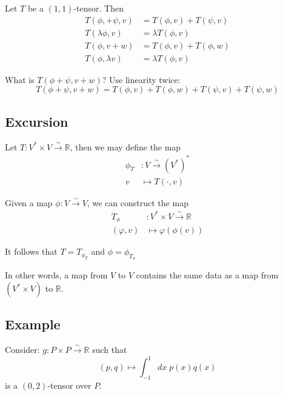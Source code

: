 \documentclass[
  letterpaper,
  DIV=11,
  numbers=noendperiod,
  oneside]{scrreprt}
\begin{document}
Let \(T\) be a \((1,1)\)-tensor. Then \begin{align}
    T(\phi, + \psi, v) &= T(\phi, v) + T(\psi, v) \\ 
    T(\lambda\phi, v) &= \lambda T(\phi, v) \\ 
    T(\phi, v+w) &= T(\phi, v) + T(\phi, w) \\ 
    T(\phi, \lambda v) &= \lambda T(\phi, v)
\end{align}

What is \(T(\phi + \psi, v + w)\)? Use linearity twice: \begin{equation}
    T(\phi + \psi, v + w) = T(\phi, v) + T(\phi, w) + T(\psi, v) + T(\psi, w)
\end{equation}

\hypertarget{excursion}{%
\subsection{Excursion}\label{excursion}}

Let \(T: V^* \times V \xrightarrow{\sim} \mathbb{R}\), then we may
define the map  \begin{align}
    \phi_T&: V \xrightarrow{\sim} (V^*)^*\\
    v&\mapsto T(\cdot, v)
\end{align}

Given a map \(\phi: V\xrightarrow{\sim} V\), we can construct the map
\begin{align}
    T_\phi &: V^*\times V \xrightarrow{\sim} \mathbb{R} \\ 
    (\varphi, v) &\mapsto \varphi(\phi(v))
\end{align}

It follows that \(T = T_{\phi_T}\) and \(\phi = \phi_{T_\phi}\)

In other words, a map from \(V\) to \(V\) contains the same data as a
map from \((V^*\times V)\) to \(\mathbb{R}\).

\hypertarget{example-4}{%
\subsection{Example}\label{example-4}}

Consider: \(g: P\times P \xrightarrow{\sim} \mathbb{R}\) such that
\begin{equation}
    (p,q) \mapsto \int_{-1}^1 dx\; p(x)q(x)
\end{equation} is a \((0,2)\)-tensor over \(P\).
\end{document}
